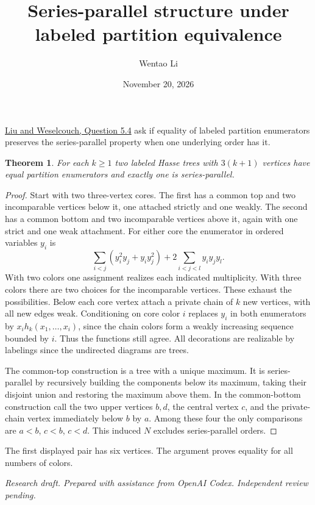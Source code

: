 \documentclass[11pt]{article}
\title{Series-parallel structure under labeled partition equivalence}
\author{Wentao Li}
\date{November 20, 2026}
\newtheorem{theorem}{Theorem}
\begin{document}
\maketitle

\href{https://arxiv.org/abs/1903.00551}{Liu and Weselcouch, Question 5.4} ask if equality of labeled partition enumerators preserves the series-parallel property when one underlying order has it.
\begin{theorem}For each $k\ge1$ two labeled Hasse trees with $3(k+1)$ vertices have equal partition enumerators and exactly one is series-parallel.\end{theorem}
\begin{proof}Start with two three-vertex cores. The first has a common top and two incomparable vertices below it, one attached strictly and one weakly. The second has a common bottom and two incomparable vertices above it, again with one strict and one weak attachment. For either core the enumerator in ordered variables $y_i$ is
\[
 \sum_{i<j}(y_i^2y_j+y_iy_j^2)+2\sum_{i<j<l}y_i y_j y_l.
\]
With two colors one assignment realizes each indicated multiplicity. With three colors there are two choices for the incomparable vertices. These exhaust the possibilities. Below each core vertex attach a private chain of $k$ new vertices, with all new edges weak. Conditioning on core color $i$ replaces $y_i$ in both enumerators by $x_i h_k(x_1,\ldots,x_i)$, since the chain colors form a weakly increasing sequence bounded by $i$. Thus the functions still agree. All decorations are realizable by labelings since the undirected diagrams are trees.

The common-top construction is a tree with a unique maximum. It is series-parallel by recursively building the components below its maximum, taking their disjoint union and restoring the maximum above them. In the common-bottom construction call the two upper vertices $b,d$, the central vertex $c$, and the private-chain vertex immediately below $b$ by $a$. Among these four the only comparisons are $a<b$, $c<b$, $c<d$. This induced $N$ excludes series-parallel orders.\end{proof}
The first displayed pair has six vertices. The argument proves equality for all numbers of colors.

\medskip\noindent\textit{Research draft. Prepared with assistance from OpenAI Codex. Independent review pending.}
\end{document}
